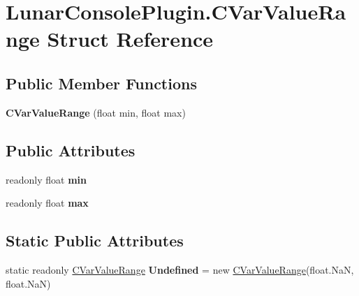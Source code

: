 \hypertarget{struct_lunar_console_plugin_1_1_c_var_value_range}{}\section{Lunar\+Console\+Plugin.\+C\+Var\+Value\+Range Struct Reference}
\label{struct_lunar_console_plugin_1_1_c_var_value_range}
\subsection*{Public Member Functions}
\begin{DoxyCompactItemize}
\item 
\mbox{\label{struct_lunar_console_plugin_1_1_c_var_value_range_a79a205662cbe42d310affda0f6ff5297}} 
{\bfseries C\+Var\+Value\+Range} (float min, float max)
\end{DoxyCompactItemize}
\subsection*{Public Attributes}
\begin{DoxyCompactItemize}
\item 
\mbox{\label{struct_lunar_console_plugin_1_1_c_var_value_range_a2e09581bf4c795b87b0f026bc352f898}} 
readonly float {\bfseries min}
\item 
\mbox{\label{struct_lunar_console_plugin_1_1_c_var_value_range_ac0229d2dd53a2b5d85251bcf286356d7}} 
readonly float {\bfseries max}
\end{DoxyCompactItemize}
\subsection*{Static Public Attributes}
\begin{DoxyCompactItemize}
\item 
\mbox{\label{struct_lunar_console_plugin_1_1_c_var_value_range_a9b7205a63020f0a879071035b7810133}} 
static readonly \mbox{\hyperlink{struct_lunar_console_plugin_1_1_c_var_value_range}{C\+Var\+Value\+Range}} {\bfseries Undefined} = new \mbox{\hyperlink{struct_lunar_console_plugin_1_1_c_var_value_range}{C\+Var\+Value\+Range}}(float.\+NaN, float.\+NaN)
\end{DoxyCompactItemize}
